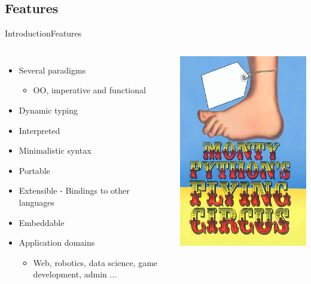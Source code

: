 \documentclass[10pt,compress]{beamer} %
\begin{document}
\subsection{Features}
\begin{frame}{Introduction}{Features}
    \begin{columns}
		\vspace{-0.3cm}
		\begin{itemize}
		\item Several paradigms
			\begin{itemize}
			\item OO, imperative and functional
			\end{itemize}
		\item Dynamic typing
		\item Interpreted
		\item Minimalistic syntax
		\item Portable
		\item Extensible - Bindings to other languages
		\item Embeddable
		\item Application domains
			\begin{itemize}
			\item Web, robotics, data science, game development, admin ...
			\end{itemize}
		\end{itemize}
		\centering \includegraphics[width=0.9\linewidth]{figs/monty.jpg}\\

\end{columns}
\end{frame}
\end{document}
